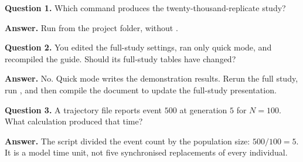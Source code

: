 \begin{checkpoint}
\textbf{Question 1.} Which command produces the twenty-thousand-replicate
study?

\textbf{Answer.} Run  from
the project folder, without .

\textbf{Question 2.} You edited the full-study settings, ran only quick
mode, and recompiled the guide. Should its full-study tables have changed?

\textbf{Answer.} No. Quick mode writes the demonstration results. Rerun
the full study, run , and then compile the
document to update the full-study presentation.

\textbf{Question 3.} A trajectory file reports event \(500\) at generation
\(5\) for \(N=100\). What calculation produced that time?

\textbf{Answer.} The script divided the event count by the population size:
\(500/100=5\). It is a model time unit, not five synchronised replacements
of every individual.
\end{checkpoint}
